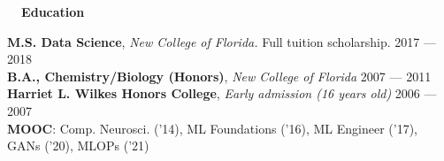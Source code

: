 \documentclass[a4paper,12pt]{article}
\newcommand{\resheading}[1]{{\vspace*{.001in} \colorbox{mygrey}{\begin{minipage}{\textwidth}{\textmd{\large \textbf{#1} \vphantom{p\^{E}}}}\end{minipage}}} }
\begin{document}
    \resheading{~~Education}

    \textbf{M.S. Data Science}, \textit{New College of Florida.} Full tuition scholarship. \hfill 2017 --- 2018\\
    \textbf{B.A., Chemistry/Biology (Honors)}, \textit{New College of Florida} \hfill 2007 --- 2011\\
    \textbf{Harriet L. Wilkes Honors College}, \textit{Early admission (16 years old)} \hfill 2006 --- 2007\\
    \textbf{MOOC}: Comp. Neurosci. ('14), ML Foundations ('16), ML Engineer ('17), GANs ('20), MLOPs ('21)
\end{document}
